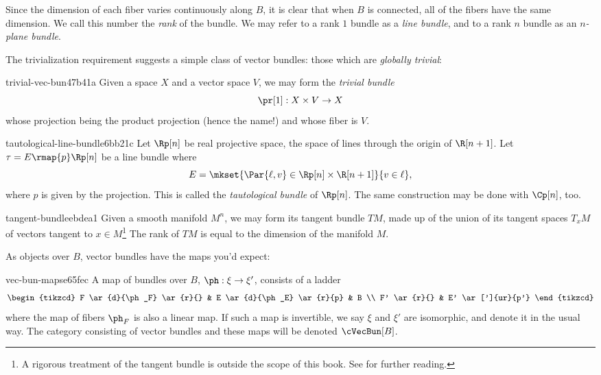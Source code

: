 Since the dimension of each fiber varies continuously along $B$, it is clear that when $B$
is connected, all of the fibers have the same dimension. We call this number the \emph{rank}
of the bundle. We may refer to a rank $1$ bundle as a \emph{line bundle}, and to a rank $n$
bundle as an \emph{$n$-plane bundle}. 

The trivialization requirement suggests a simple class of vector bundles: those which
are \emph{globally trivial}:
\begin{exmp}{trivial-vec-bun}{47b41a}
  Given a space $X$ and a vector space $V$, we may form the \emph{trivial bundle}
  \[ \pr[1]: X \times V \to X \]
  whose projection being the product projection (hence the name!) and whose fiber is $V$. 
\end{exmp}

\begin{exmp}{tautological-line-bundle}{6bb21c}
  Let $\Rp[n]$ be real projective space, the space of lines through the origin of
  $\R[n+1]$. Let $\tau = E \rmap{p} \Rp[n]$ be a line bundle where
  \[ E = \mkset{ \Par{\ell, v} \in \Rp[n] \times \R[n+1] }{ v \in \ell }, \] 
  where $p$ is given by the projection. This is called the \emph{tautological bundle} of
  $\Rp[n]$. The same construction may be done with $\Cp[n]$, too.
\end{exmp}

\begin{exmp}{tangent-bundle}{ebdea1}
  Given a smooth manifold $M^n$, we may form its tangent bundle $TM$, made up of the union of
  its tangent spaces $T_x M$ of vectors tangent to $x \in M$\footnote{A rigorous treatment of
  the tangent bundle is outside the scope of this book. See \citeme for further reading.}
  The rank of $TM$ is equal to the dimension of the manifold $M$.
\end{exmp}

As objects over $B$, vector bundles have the maps you'd expect:

\begin{defn}{vec-bun-maps}{e65fec}
  A map of bundles over $B$, $\ph: \xi \to \xi'$, consists of a ladder
  \[\begin{tikzcd}
    F \ar{d}{\ph_F} \ar{r}{} & E \ar{d}{\ph_E} \ar{r}{p} & B \\
    F' \ar{r}{} & E' \ar[']{ur}{p'}
  \end{tikzcd}\]
  where the map of fibers $\ph_F$ is also a linear map. If such a map
  is invertible, we say $\xi$ and $\xi'$ are isomorphic, and denote it
  in the usual way. The category consisting of vector bundles and these maps
  will be denoted $\cVecBun[B]$. 
\end{defn}

